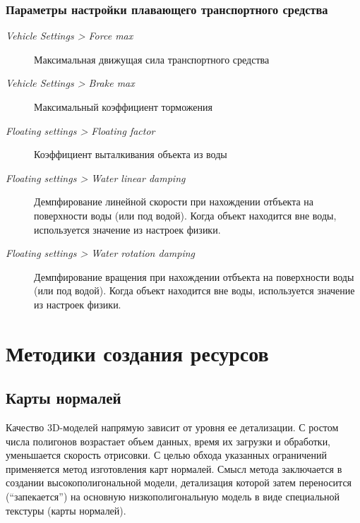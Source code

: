 \documentclass[a4paper,12pt,oneside]{sphinxmanual}
\begin{document}
\subsection{Параметры настройки плавающего транспортного средства}
\label{physics:id10}\begin{description}
\item[{\emph{Vehicle Settings \textgreater{} Force max}}] \leavevmode
Максимальная движущая сила транспортного средства

\item[{\emph{Vehicle Settings \textgreater{} Brake max}}] \leavevmode
Максимальный коэффициент торможения

\item[{\emph{Floating settings \textgreater{} Floating factor}}] \leavevmode
Коэффициент выталкивания объекта из воды

\item[{\emph{Floating settings \textgreater{} Water linear damping}}] \leavevmode
Демпфирование линейной скорости при нахождении отбъекта на поверхности воды (или под водой). Когда объект находится вне воды, используется значение из настроек физики.

\item[{\emph{Floating settings \textgreater{} Water rotation damping}}] \leavevmode
Демпфирование вращения при нахождении отбъекта на поверхности воды (или под водой). Когда объект находится вне воды, используется значение из настроек физики.

\end{description}


\chapter{Методики создания ресурсов}
\label{assets_creation::doc}\label{assets_creation:id1}

\section{Карты нормалей}
\label{assets_creation:normal-mapping}\label{assets_creation:id2}
Качество 3D-моделей напрямую зависит от уровня ее детализации. С ростом числа полигонов возрастает объем данных, время их загрузки и обработки, уменьшается скорость отрисовки. С целью обхода указанных ограничений применяется метод изготовления карт нормалей. Смысл метода заключается в создании высокополигональной модели, детализация которой затем переносится (``запекается'') на основную низкополигональную модель в виде специальной текстуры (карты нормалей).
\end{document}
